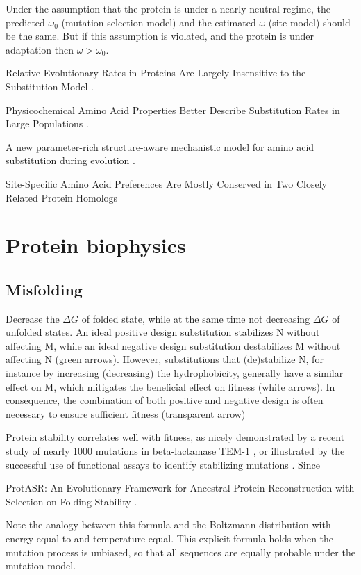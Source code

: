 Under the assumption that the protein is under a nearly-neutral regime, the predicted $\omega_0$ (mutation-selection model) and the estimated $\omega$ (site-model) should be the same. But if this assumption is violated, and the protein is under adaptation then $\omega > \omega_0$.

Relative Evolutionary Rates in Proteins Are Largely Insensitive to the Substitution Model \citep{Spielman2018}.

Physicochemical Amino Acid Properties Better Describe Substitution Rates in Large Populations \citep{Weber2019}.

A new parameter-rich structure-aware mechanistic model for amino acid \gls{substitution} during evolution \citep{Chi2018}.


Site-Specific Amino Acid Preferences Are Mostly Conserved in Two Closely Related Protein Homologs \citep{Doud2015}

\section{Protein biophysics}

\subsection{Misfolding}

Decrease the $\Delta G$ of folded state, while at the same time not decreasing $\Delta G$ of unfolded states.
An ideal positive design \gls{substitution} stabilizes N without affecting M, while an ideal negative design \gls{substitution} destabilizes M without affecting N (green arrows). However, substitutions that (de)stabilize N, for instance by increasing (decreasing) the hydrophobicity, generally have a similar effect on M, which mitigates the beneficial effect on fitness (white arrows). In consequence, the combination of both positive and negative design is often necessary to ensure sufficient fitness (transparent arrow)

Protein stability correlates well with fitness, as nicely demonstrated by a recent study of nearly 1000 mutations in beta-lactamase TEM-1 \citep{Jacquier2013}, or illustrated by the successful use of functional assays to identify stabilizing mutations \citep{Araya2012}. Since

ProtASR: An Evolutionary Framework for Ancestral Protein Reconstruction with Selection on Folding Stability \citep{Arenas2017}.

Note the analogy between this formula and the Boltzmann distribution with energy equal to and temperature equal. This explicit formula holds when the mutation process is unbiased, so that all sequences are equally probable under the mutation model. 

